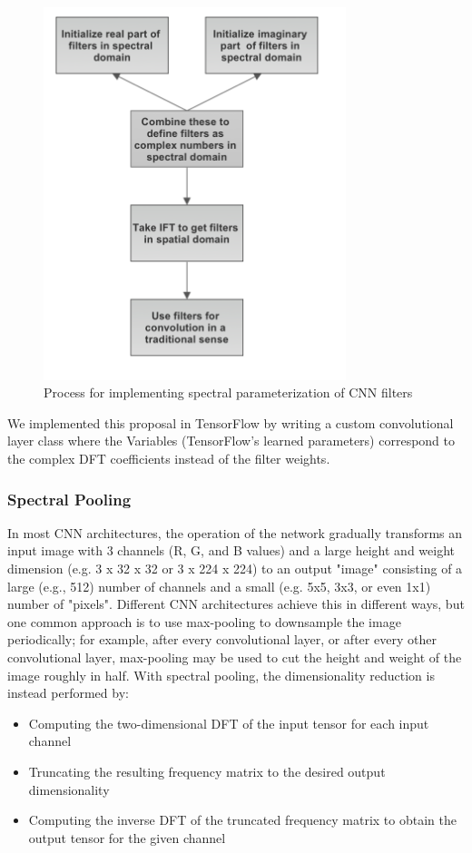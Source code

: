 \documentclass[10pt,journal,compsoc]{IEEEtran}
\begin{document}
\begin{figure}[ht]
\centering
  \includegraphics[width=250pt]{images/fc_spectral_param.png}
  \caption{Process for implementing spectral parameterization of CNN filters}
  \label{fig:spec_param}
\end{figure}

We implemented this proposal in TensorFlow by writing a custom convolutional layer class where the Variables (TensorFlow's learned parameters) correspond to the complex DFT coefficients instead of the filter weights.

\subsubsection{Spectral Pooling}

In most CNN architectures, the operation of the network gradually transforms an input image with 3 channels (R, G, and B values) and a large height and weight dimension (e.g. 3 x 32 x 32 or 3 x 224 x 224) to an output "image" consisting of a large (e.g., 512) number of channels and a small (e.g. 5x5, 3x3, or even 1x1) number of "pixels". Different CNN architectures achieve this in different ways, but one common approach is to use max-pooling to downsample the image periodically; for example, after every convolutional layer, or after every other convolutional layer, max-pooling may be used to cut the height and weight of the image roughly in half. With spectral pooling, the dimensionality reduction is instead performed by:
\begin{itemize}
\item Computing the two-dimensional DFT of the input tensor for each input channel
\item Truncating the resulting frequency matrix to the desired output dimensionality
\item Computing the inverse DFT of the truncated frequency matrix to obtain the output tensor for the given channel
\end{itemize}
\end{document}
